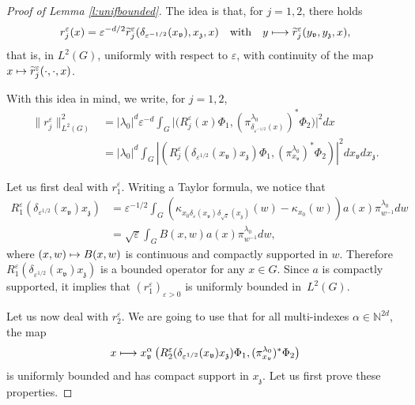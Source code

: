\documentclass[JEP,XML,SOM,Unicode,published]{cedram}
\newcommand\mto{\mathchoice{\longmapsto}{\mapsto}{\mapsto}{\mapsto}}
\theoremstyle{plain}
\theoremstyle{definition}
\let\eps\varepsilon
\def\N{{\mathbb N}}
\begin{document}
\begin{proof}[Proof of Lemma \ref{l:unifbounded}]
The idea is that, for $j=1,2$, there holds
\[
r_j^\eps(x)= \eps^{-d/2} \widetilde r_j^\eps(\delta_{\eps^{-1/2}} (x_{\mathfrak v}), x_{\mathfrak z}, x)\quad\text{with}\quad
y\mto \widetilde r_j^\eps (y_{\mathfrak v}, y_{\mathfrak z}, x),
\]
that is, in $L^2(G)$, uniformly with respect to $\eps$, with continuity of the map $x\mto \widetilde r_j^\eps (\cdot,\cdot, x)$.

With this idea in mind, we write, for $j=1,2$,
\begin{align*}
\| r_j^\eps\|_{L^2(G)}^2 &
= |\lambda_0|^{d}\eps ^{-d} \int_G \bigl| \bigl(R_j^\eps(x) \Phi_1,
(\pi^{\lambda_0}_{\delta_{\eps^{-1/2} }(x)})^*\Phi_2 \bigr) \bigr|^2 dx\\
\label{eq:boundtoto}
&= |\lambda_0|^{d} \int_G\left|\left(R_j^\eps(\delta_{\eps^{1/2}} (x_{\mathfrak v})x_{\mathfrak z}) \Phi_1,
(\pi^{\lambda_0}_{x_{\mathfrak v}})^*\Phi_2\right)\right|^2 dx_{\mathfrak v} dx_{\mathfrak z}.
\end{align*}

Let us first deal with $r_1^\eps$. Writing a Taylor formula, we notice that
\begin{align*}
R_1^\eps(\delta_{\eps^{1/2}} (x_{\mathfrak v})x_{\mathfrak z})&=\eps^{-1/2} \int_{G} (\kappa_{x_0\delta_{\eps}(x_{\mathfrak v}) \delta_{\sqrt\eps}(x_{\mathfrak z})}(w)-\kappa_{x_0}(w))a(x) \pi_{ w^{-1} }^{\lambda_0} dw \\
&=\sqrt\eps \int_G B(x,w)a(x)\pi_{ w^{-1} }^{\lambda_0} dw,
\end{align*}
where $(x,w)\mto B(x,w)$ is continuous and compactly supported in $w$. Therefore $R_1^\eps(\delta_{\eps^{1/2}} (x_{\mathfrak v})x_{\mathfrak z})$ is a bounded operator for any $x\in G$. Since $a$ is compactly supported, it implies that $(r_1^\eps)_{\eps>0}$ is uniformly bounded in~$L^2(G)$.

Let us now deal with $r_2^\eps$. We are going to use that for all multi-indexes $\alpha\in\N^{2d}$, the map
\begin{equation} \label{e:map}
x\mto x_{\mathfrak v}^\alpha \left(R_2^\eps(\delta_{\eps^{1/2}} (x_{\mathfrak v})x_{\mathfrak z}) \Phi_1,
(\pi^{\lambda_0}_{x_{\mathfrak v}})^*\Phi_2\right)
\end{equation}
is uniformly bounded and has compact support in $x_{\mathfrak z}$. Let us first prove these properties.


\end{proof}
\end{document}
